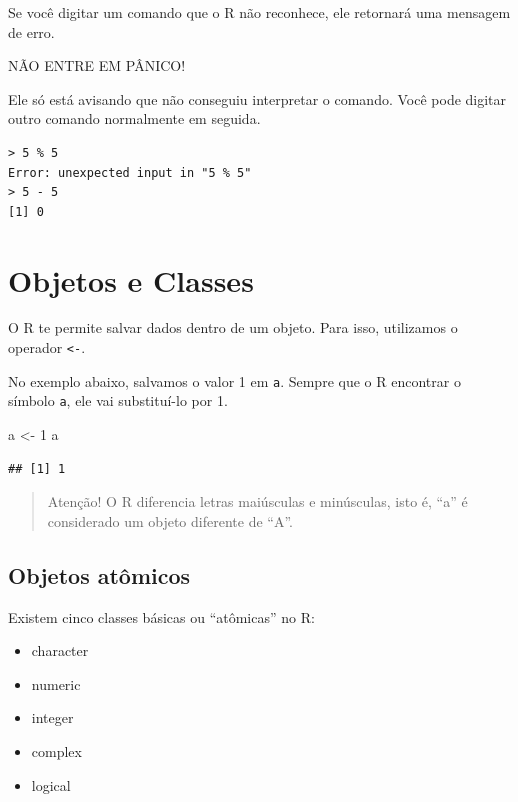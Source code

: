 \documentclass[
]{book}
\newenvironment{Shaded}{\begin{snugshade}}{\end{snugshade}}
\newcommand{\DecValTok}[1]{\textcolor[rgb]{0.00,0.00,0.81}{#1}}
\newcommand{\NormalTok}[1]{#1}
\newcommand{\StringTok}[1]{\textcolor[rgb]{0.31,0.60,0.02}{#1}}
\providecommand{\tightlist}{%
  \setlength{\itemsep}{0pt}\setlength{\parskip}{0pt}}
\begin{document}
Se você digitar um comando que o R não reconhece, ele retornará uma mensagem de erro.

NÃO ENTRE EM PÂNICO!

Ele só está avisando que não conseguiu interpretar o comando. Você pode digitar outro comando normalmente em seguida.

\begin{verbatim}
> 5 % 5
Error: unexpected input in "5 % 5"
> 5 - 5
[1] 0
\end{verbatim}

\hypertarget{objetos-e-classes}{%
\section{Objetos e Classes}\label{objetos-e-classes}}

O R te permite salvar dados dentro de um objeto. Para isso, utilizamos o operador \texttt{\textless{}-}.

No exemplo abaixo, salvamos o valor 1 em \texttt{a}. Sempre que o R encontrar o símbolo \texttt{a}, ele vai substituí-lo por 1.

\begin{Shaded}
\begin{Highlighting}[]
\NormalTok{a <{-}}\StringTok{ }\DecValTok{1}
\NormalTok{a}
\end{Highlighting}
\end{Shaded}

\begin{verbatim}
## [1] 1
\end{verbatim}

\begin{quote}
Atenção! O R diferencia letras maiúsculas e minúsculas, isto é, ``a'' é considerado um objeto diferente de ``A''.
\end{quote}

\hypertarget{objetos-atuxf4micos}{%
\subsection{Objetos atômicos}\label{objetos-atuxf4micos}}

Existem cinco classes básicas ou ``atômicas'' no R:

\begin{itemize}
\tightlist
\item
  character
\item
  numeric
\item
  integer
\item
  complex
\item
  logical
\end{itemize}
\end{document}
